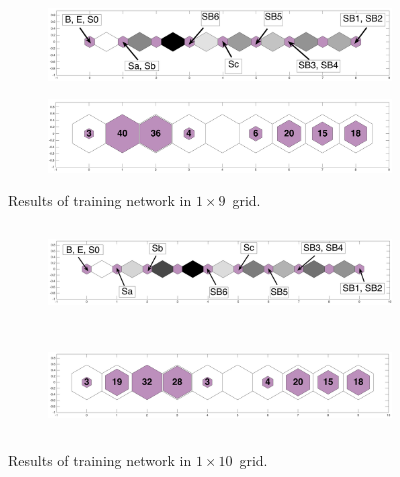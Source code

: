     \begin{figure}
        \begin{subfigure}[b]{0.5\textwidth}
            \centering
            \includegraphics[width=\textwidth]{../images0.01/1d/apps/dist_1_by_9.png}
        \end{subfigure}
        \hfill
        \begin{subfigure}[b]{0.5\textwidth}
             \includegraphics[width=\textwidth]{../images0.01/1d/apps/hit_v_1_by_9.png}
        \end{subfigure}
                \caption{Results of training network in $1\times9$~grid.}
         \label{fig: 1by9T}
    \end{figure}

    \begin{figure}
        \begin{subfigure}[b]{0.5\textwidth}
            \centering
            \includegraphics[width=\textwidth,height=2.5cm]{../images0.01/1d/apps/dist_1_by_10.png}
        \end{subfigure}
        \hfill
        \begin{subfigure}[b]{0.5\textwidth}
             \includegraphics[width=\textwidth,height=2.5cm]{../images0.01/1d/apps/hit_v_1_by_10.png}
        \end{subfigure}
                \caption{Results of training network in $1\times10$~grid.}
         \label{fig: 1by10T}
    \end{figure}

